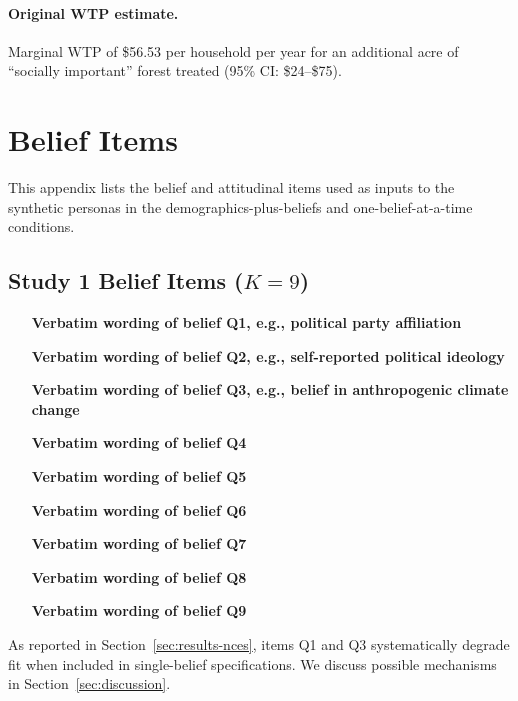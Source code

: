 \documentclass[12pt]{article}
\begin{document}
\paragraph{Original WTP estimate.} Marginal WTP of \$56.53 per household per year for an additional acre of ``socially important'' forest treated (95\% CI: \$24--\$75).

\section{Belief Items}\label{app:belief-items}

This appendix lists the belief and attitudinal items used as inputs to the synthetic personas in the demographics-plus-beliefs and one-belief-at-a-time conditions.

\subsection{Study 1 Belief Items ($K = 9$)}

\begin{enumerate}[label=Q\arabic*., leftmargin=*]
    \item [\textbf{Verbatim wording of belief Q1, e.g., political party affiliation}]
    \item [\textbf{Verbatim wording of belief Q2, e.g., self-reported political ideology}]
    \item [\textbf{Verbatim wording of belief Q3, e.g., belief in anthropogenic climate change}]
    \item [\textbf{Verbatim wording of belief Q4}]
    \item [\textbf{Verbatim wording of belief Q5}]
    \item [\textbf{Verbatim wording of belief Q6}]
    \item [\textbf{Verbatim wording of belief Q7}]
    \item [\textbf{Verbatim wording of belief Q8}]
    \item [\textbf{Verbatim wording of belief Q9}]
\end{enumerate}

\noindent As reported in Section~\ref{sec:results-nces}, items Q1 and Q3 systematically degrade fit when included in single-belief specifications. We discuss possible mechanisms in Section~\ref{sec:discussion}.
\end{document}
